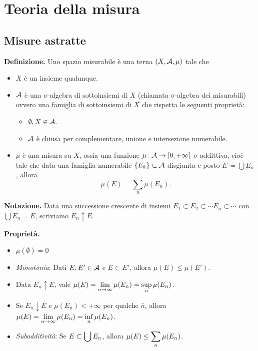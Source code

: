 %
%

\chapter{Teoria della misura}

\section{Misure astratte}

\textbf{Definizione.} 
Uno spazio misurabile è una terna $(X, \mathcal{A}, \mu)$ tale che
\begin{itemize}
	
	\item $X$ è un insieme qualunque.

	\item $\mathcal{A}$ è una $\sigma$-algebra di sottoinsiemi di $X$ (chiamata $\sigma$-algebra dei misurabili) ovvero una famiglia di sottoinsiemi di $X$ che rispetta le seguenti proprietà:
		\begin{itemize}
			\item $\emptyset, X \in \mathcal{A}$.
			\item $\mathcal{A}$ è chiusa per complementare, unione e intersezione numerabile.
		\end{itemize}
	
	\item $\mu$ è una misura su $X$, ossia una funzione $\mu \colon \mathcal{A} \to [0, +\infty]$ $\sigma$-addittiva, cioè tale che data una famiglia numerabile $\left\{ E_k \right\} \subset \mathcal{A}$ disgiunta e posto $E \coloneqq \bigcup E_n $, allora
		$$
		\mu(E) = \sum_{n} \mu (E_n).
		$$

\end{itemize}


\textbf{Notazione.}
Data una successione crescente di insiemi $E_1 \subset E_2 \subset \cdots E_n \subset \cdots$ con $\bigcup E_n = E$, scriviamo $E_n \uparrow E$.

\textbf{Proprietà.}
\begin{itemize}
	\item $\mu(\emptyset) = 0$
	\item \textit{Monotonia}: Dati $E,E' \in \mathcal{A}$ e $E \subset E'$, allora $\mu(E) \leq \mu(E')$.
	\item Data $E_n \uparrow E$, vale $\displaystyle \mu(E) = \lim_{n \to \infty} \mu(E_n) = \sup_{n} \mu(E_n)$.
	\item Se $E_n \downarrow E$ e $\mu (E_{\bar{n}}) < +\infty$ per qualche $\bar{n}$, allora $\displaystyle \mu(E) = \lim_{n \to \infty} \mu(E_n) = \inf_{n} \mu(E_n)$.
	\item \textit{Subadditività}: Se $\displaystyle E \subset \bigcup E_n $, allora $\displaystyle \mu(E) \leq \sum_{n} \mu(E_n)$.
\end{itemize}

